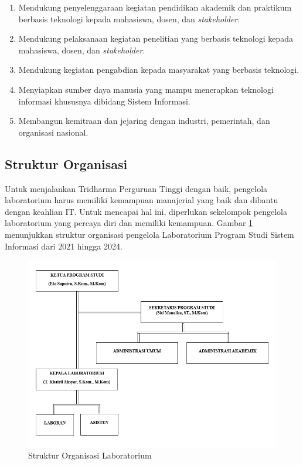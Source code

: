 \begin{enumerate}

	\item Mendukung penyelenggaraan kegiatan pendidikan akademik dan praktikum berbasis teknologi kepada mahasiswa, dosen, dan \textit{stakeholder}.
	\item Mendukung pelaksanaan kegiatan penelitian yang berbasis teknologi kepada mahasiswa, dosen, dan \textit{stakeholder}.
	\item Mendukung kegiatan pengabdian kepada masyarakat yang berbasis teknologi.
	\item Menyiapkan sumber daya manusia yang mampu menerapkan teknologi informasi khususnya dibidang Sistem Informasi.
	\item Membangun kemitraan dan jejaring dengan industri, pemerintah, dan organisasi nasional.

\end{enumerate}
\subsection{Struktur Organisasi}
Untuk menjalankan Tridharma Perguruan Tinggi dengan baik, pengelola laboratorium harus memiliki kemampuan manajerial yang baik dan dibantu dengan keahlian IT. Untuk mencapai hal ini, diperlukan sekelompok pengelola laboratorium yang percaya diri dan memiliki kemampuan. Gambar \ref{fig:struktur-organisasi} menunjukkan struktur organisasi pengelola Laboratorium Program Studi Sistem Informasi dari 2021 hingga 2024.

\begin{figure}[h]
	\centering
	\includegraphics[width=0.82\linewidth]{konten/gambar/Struktur Organisasi.png}
	\caption{Struktur Organisasi Laboratorium \protect\cite{labsi2023}}
	\label{fig:struktur-organisasi}
\end{figure}

